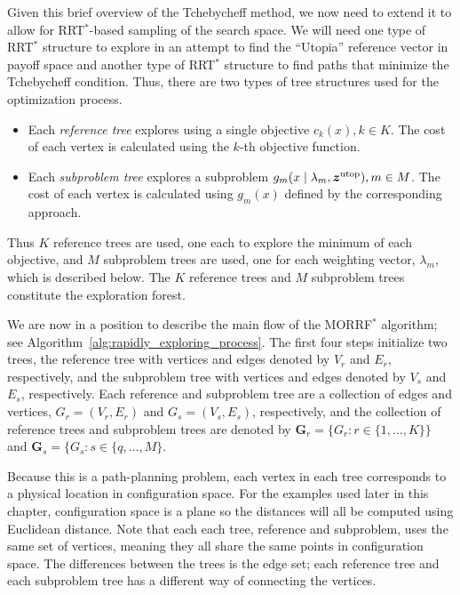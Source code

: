 \documentclass{article}
\begin{document}
Given this brief overview of the Tchebycheff method, we now need to extend it to allow for RRT$^{*}$-based sampling of the search space.  
We will need one type of RRT$^{*}$ structure to explore in an attempt to find the ``Utopia'' reference vector in payoff space and another type of RRT$^{*}$ structure to find paths that minimize the Tchebycheff condition.  
Thus, there are two types of tree structures used for the optimization process.
\begin{itemize}
\item Each \emph{reference tree} explores using a single objective $ c_{k} (x), k \in K $. 
The cost of each vertex is calculated using the $ k $-th objective function.
\item Each \emph{subproblem tree} explores a subproblem $ g_{m} ( x \mid \lambda_{m} , \bm{z}^{\rm utop} ) , m \in M $.
The cost of each vertex is calculated using $ g_{m}(x) $ defined by the corresponding approach.
\end{itemize}
Thus $ K $ reference trees are used, one each to explore the minimum of each objective, and $ M $ subproblem trees are used, one for each weighting vector, $ \lambda_{m} $, which is described below.  
The $K$ reference trees and $M$ subproblem trees constitute the exploration forest.

We are now in a position to describe the main flow of the MORRF$^{*}$ algorithm; see Algorithm~\ref{alg:rapidly_exploring_process}.  
The first four steps initialize two trees, the reference tree with vertices and edges denoted by $V_r$ and $E_r$, respectively, and the subproblem tree with vertices and edges denoted by $V_s$ and $E_s$, respectively.  
Each reference and subproblem tree are a collection of edges and vertices, $G_r=(V_r,E_r)$ and $G_s=(V_s,E_s)$, respectively, and the collection of reference trees and subproblem trees are denoted by ${\mathbf G}_r = \{G_r: r\in \{1, \ldots, K\}\}$ and ${\mathbf G}_s = \{G_s: s \in \{q, \ldots, M\}$.  

Because this is a path-planning problem, each vertex in each tree corresponds to a physical location in configuration space.  
For the examples used later in this chapter, configuration space is a plane so the distances will all be computed using Euclidean distance. 
Note that each each tree, reference and subproblem, uses the same set of vertices, meaning they all share the same points in configuration space.  
The differences between the trees is the edge set; each reference tree and each subproblem tree has a different way of connecting the vertices.
\end{document}
